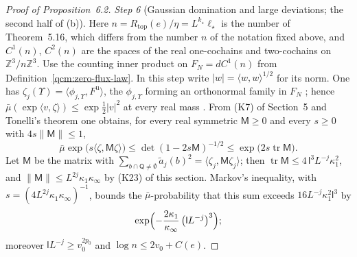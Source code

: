 \documentclass[11pt,letterpaper,reqno]{amsart}
\theoremstyle{definition}
\begin{document}
\begin{proof}[Proof of Proposition~6.2]
\emph{Step 6} (Gaussian domination and large deviations; the second half of (b)).
Here $n=R_{\mathrm{top}}(e)/\eta=L^{k_\star}\ell_\star$ is the number of Theorem~5.16, which differs from the number $n$ of the notation fixed above, and $C^1(n)$, $C^2(n)$ are the spaces of the real one-cochains and two-cochains on $\mathbb Z^3/n\mathbb Z^3$.
Use the counting inner product on $F_N=dC^1(n)$ from Definition~\ref{qcm:zero-flux-law}. In this step write $|w|=\langle w,w\rangle^{1/2}$ for its norm.
One has $\zeta_j(\Upsilon)=\langle\phi_{j,\Upsilon},F^{\mathrm u}\rangle$, the $\phi_{j,\Upsilon}$ forming an orthonormal family in $F_N$ \cite[Proposition~22.1]{QEDConstruction};
hence $\bar\mu(\exp\langle v,\zeta\rangle)\le\exp\frac12|v|^2$ at every real mass \cite[Proposition~21.2]{QEDConstruction}.
From (K7) of Section~5 and Tonelli's theorem one obtains, for every real symmetric $\mathsf M\ge0$ and every $s\ge0$ with $4s\|\mathsf M\|\le1$,
\begin{equation*}
\bar\mu\exp\bigl(s\langle\zeta,\mathsf M\zeta\rangle\bigr)\le\det(1-2s\mathsf M)^{-1/2}\le\exp\bigl(2s\operatorname{tr}\mathsf M\bigr).
\end{equation*}
Let $\mathsf M$ be the matrix with $\sum_{b\cap\mathsf Q\ne\emptyset}\tilde a_j(b)^2=\allowbreak \langle\zeta_j,\allowbreak \mathsf M\zeta_j\rangle$;
then $\operatorname{tr}\mathsf M\le4\,\mathsf l^3L^{-j}\kappa_1^2$, and $\|\mathsf M\|\le L^{2j}\kappa_1\kappa_\infty$ by (K23) of this section.
Markov's inequality, with $s=(4L^{2j}\kappa_1\kappa_\infty)^{-1}$, bounds the $\bar\mu$-probability that this sum exceeds $16L^{-j}\kappa_1^2\mathsf l^3$ by
\begin{equation*}
\exp\Bigl(-\frac{2\kappa_1}{\kappa_\infty}\,\bigl(\mathsf lL^{-j}\bigr)^3\Bigr);
\end{equation*}
moreover $\mathsf lL^{-j}\ge v_0^{2p_0}$ and $\log n\le2v_0+C(e)$.


\end{proof}
\end{document}
